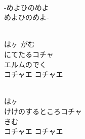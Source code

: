 \documentclass[10pt,b5j]{tarticle} %
\begin{document}
\vspace{1.5em} %
\newcommand{\linespace}{0.5em} %
\newcommand{\blocksize}{0.5\hsize} %
\newcommand{\itemmargin}{3em} %
\begin{enumerate} %
    \setlength{\itemindent}{\itemmargin} %
    \begin{minipage}[c]{\blocksize}
    
        \vspace{\linespace}
        \item~\\
        -めよひのめよ\\
        めよひのめよ-
        
    \end{minipage}
    \begin{minipage}[c]{\blocksize}
        
        \vspace{\linespace}
        \item~\\
        はヶ がむ\\
        にてたるコチャ\\
        エルムのでく\\
        コチャエ コチャエ
        
    \end{minipage}
    \begin{minipage}[c]{\blocksize}
        
        \vspace{\linespace}
        \item~\\
        はヶ　\\
        けけのするところコチャ\\
        きむ\\
        コチャエ コチャエ
        

\end{minipage}
\end{enumerate}
\end{document}
